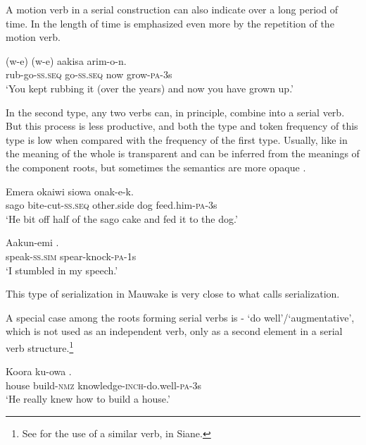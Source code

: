A motion verb in a serial construction can also indicate  over a long period of time. In  the length of time is emphasized even more by the repetition of the motion verb.

\ea%
\label{ex:3:x439}
\gll {}(w-e) (w-e) aakisa arim-o-n. \\
rub-go-\textsc{ss}.\textsc{seq} go-\textsc{ss}.\textsc{seq} now grow-\textsc{pa}-3s\\
\glt`You kept rubbing it (over the years) and now you have grown up.'
\z

In the second type, any two verbs can, in principle, combine into a serial verb. But this process is less productive, and both the type and token frequency of this type is low when compared with the frequency of the first type. Usually, like in  the meaning of the whole is transparent and can be inferred from the meanings of the component roots, but sometimes the semantics are more opaque .

\ea%
\label{ex:3:x382}
\gll Emera  okaiwi siowa onak-e-k. \\
sago bite-cut-\textsc{ss}.\textsc{seq} other.side dog feed.him-\textsc{pa}-3s \\
\glt`He bit off half of the sago cake and fed it to the dog.'
\z

\ea%
\label{ex:3:x383}
\gll Aakun-emi . \\
speak-\textsc{ss}.\textsc{sim} spear-knock-\textsc{pa}-1s \\
\glt`I stumbled in my speech.'
\z

This type of serialization in Mauwake is very close to what \citet[1--5]{James1983} calls  serialization. 

A special case among the roots forming serial verbs is - `do well'/`augmentative', which is not used as an independent verb, only as a second element in a serial verb structure.\footnote{See \citet[32]{James1983} for the use of a similar verb,  in Siane.}

\ea%
\label{ex:3:x384}
\gll Koora ku-owa . \\
house build-\textsc{nmz} knowledge-\textsc{inch}-do.well-\textsc{pa}-3s \\
\glt`He really knew how to build a house.'
\z

